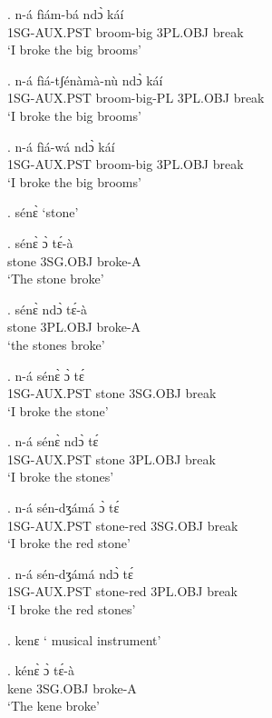 \documentclass{assets/fieldnotes}
\begin{document}
{\exg.  n-á fìám-bá ndɔ̀ káí\\
 1SG-AUX.PST broom-big 3PL.OBJ break\\
`I broke the big brooms'

\exg.  n-á fìá-tʃénàmà-nù ndɔ̀ káí\\
 1SG-AUX.PST broom-big-PL 3PL.OBJ break\\
`I broke the big brooms'


\exg.  n-á fìá-wá ndɔ̀ káí\\
 1SG-AUX.PST broom-big 3PL.OBJ break\\
`I broke the big brooms'

\ex. sénɛ̀
`stone'



\exg. sénɛ̀ ɔ̀ tɛ́-à\\
stone 3SG.OBJ broke-A\\
`The stone broke'

\exg. sénɛ̀ ndɔ̀ tɛ́-à\\
stone 3PL.OBJ broke-A\\
`the stones broke'

\exg. n-á sénɛ̀ ɔ̀ tɛ́\\
1SG-AUX.PST stone 3SG.OBJ break\\
`I broke the stone'

\exg. n-á sénɛ̀ ndɔ̀ tɛ́\\
1SG-AUX.PST stone 3PL.OBJ break\\
`I broke the stones'

\exg. n-á sén-dʒámá ɔ̀ tɛ́\\
1SG-AUX.PST stone-red 3SG.OBJ break\\
`I broke the red stone'

\exg. n-á sén-dʒámá ndɔ̀ tɛ́\\
1SG-AUX.PST stone-red 3PL.OBJ break\\
`I broke the red stones'

\ex. kenɛ
` musical instrument'

\exg. kénɛ̀ ɔ̀ tɛ́-à\\
kene 3SG.OBJ broke-A\\
`The kene broke'

}
\end{document}
